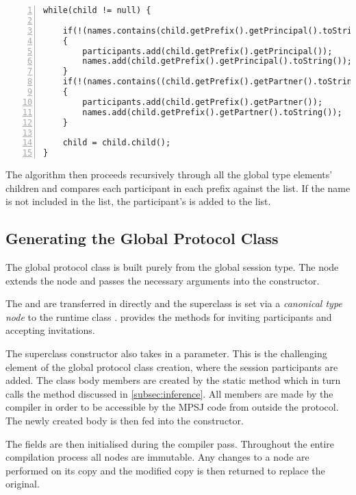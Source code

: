 \begin{lstlisting}[basicstyle=\LISTINGSTYLE, numbers=left]
while(child != null) {
			
	if(!(names.contains(child.getPrefix().getPrincipal().toString())))
	{
		participants.add(child.getPrefix().getPrincipal());
		names.add(child.getPrefix().getPrincipal().toString());
	}
	if(!(names.contains((child.getPrefix().getPartner().toString())))) 
	{
		participants.add(child.getPrefix().getPartner());
		names.add(child.getPrefix().getPartner().toString());
	}
	
	child = child.child();	
}
\end{lstlisting}

The algorithm then proceeds recursively through all the global type elements' children and compares each participant in each prefix against the  list. If the name is not included in the list, the participant's  is added to the list.


\subsection{Generating the Global Protocol Class}

The global protocol class is built purely from the global session type. The  node extends the  node and passes the necessary arguments into the  constructor.

The  and  are transferred in directly and the superclass is set via a \textit{canonical type node} to the runtime class .  provides the methods for inviting participants and accepting invitations.

The superclass constructor also takes in a  parameter. This is the challenging element of the global protocol class creation, where the session participants are added. The class body members are created by the static method  which in turn calls the  method discussed in \autoref{subsec:inference}. All members are made  by the compiler in order to be accessible by the MPSJ code from outside the protocol. The newly created body is then fed into the  constructor. 

The  fields are then initialised during the  compiler pass. Throughout the entire compilation process all nodes are immutable. Any changes to a node are performed on its copy and the modified copy is then returned to replace the original.


